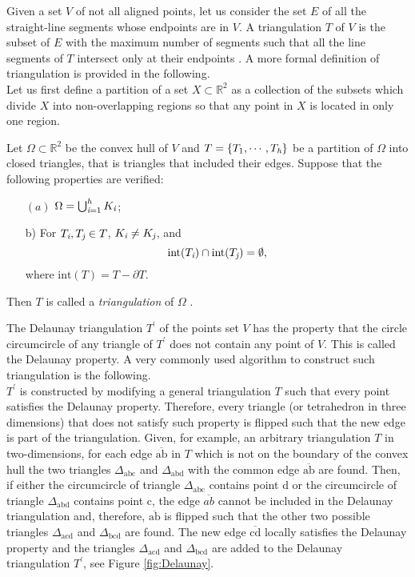 Given a set $V$ of not all aligned points, let us consider the set $E$ of all the straight-line segments whose endpoints are in $V$. 
A triangulation $T$ of $V$ is the subset of $E$ with the maximum number of segments such that all the line segments of $T$ intersect only at their endpoints \cite{lloyd1977triangulations}. 
A more formal definition of triangulation is provided in the following.
\\ \indent Let us first define a partition of a set $X\subset \mathbb{R}^2$ as a collection of the subsets which divide $X$ into non-overlapping regions so that any point in $X$ is located in only one region. 
\begin{definition} \indent Let $\Omega\subset \mathbb{R}^2$ be the convex hull of $V$ and $T = \{T_1, \cdots, T_{\textit{h}}\}$ be a partition of $\Omega$ into closed triangles, that is triangles that included their edges. Suppose that the following properties are verified:
\begin{itemize}
\item[$(a)$] $\Omega = \bigcup_{\textit{i} = 1}^{\textit{h}}K_{\textit{i}}$;
\item[b)] For $T_{\textit{i}}, T_{\textit{j}} \in T$, $K_{\textit{i}} \neq K_{\textit{j}}$, and 
\begin{equation*}
\textrm{int}(T_{\textit{i}})\cap \textrm{int}(T_{\textit{j}}) = \emptyset,
\end{equation*}
where $\textrm{int}(T) = T-\partial T$.
\end{itemize}
Then $T$ is called a \textit{triangulation} of $\Omega$ \cite{Numericalmethods}.
\end{definition}
The Delaunay triangulation $T^{\prime}$ of the points set $V$ has the property that the circle circumcircle of any triangle of $T^{\prime}$ does not contain any point of $V$. This is called the Delaunay property. A very commonly used algorithm to construct such triangulation is the following.\\ \indent 
$T^\prime$ is constructed by modifying a general triangulation $T$ such that every point satisfies the Delaunay property. 
Therefore, every triangle (or tetrahedron in three dimensions) that does not satisfy such property is flipped such that the new edge is part of the triangulation. 
Given, for example, an arbitrary triangulation $T$ in two-dimensions, for each edge $\overline{\textrm{ab}}$ in $T$ which is not on the boundary of the convex hull the two triangles 
$\Delta_{\textrm{abc}}$ and $\Delta_{\textrm{abd}}$ with the common edge $\overline{\textrm{ab}}$ are found. Then, if either the circumcircle of triangle $\Delta_{\textrm{abc}}$ contains point \textrm{d} or the circumcircle of triangle $\Delta_{\textrm{abd}}$ contains point \textrm{c}, the edge $\overline{ab}$ cannot be included in the Delaunay triangulation and, therefore, $\overline{\textrm{ab}}$ is flipped such that the other two possible triangles $\Delta_{\textrm{acd}}$ and $\Delta_{\textrm{bcd}}$ are found. The new edge $\overline{\textrm{cd}}$ locally satisfies the Delaunay property and the triangles $\Delta_{\textrm{acd}}$ and  $\Delta_{\textrm{bcd}}$ are added to the Delaunay triangulation $T^\prime$, see Figure \ref{fig:Delaunay}.  
